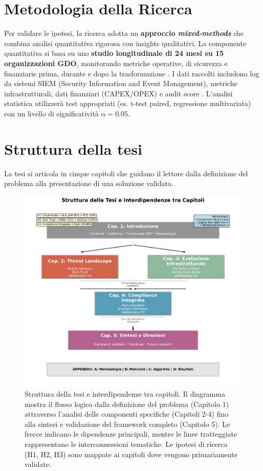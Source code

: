 \section{Metodologia della Ricerca}
Per validare le ipotesi, la ricerca adotta un  \textbf{approccio \textit{mixed-methods}} che combina analisi quantitativa rigorosa con insights qualitativi. La componente quantitativa si basa su uno
\textbf{studio longitudinale di 24 mesi su 15 organizzazioni GDO}, monitorando metriche operative, di sicurezza e finanziarie prima, durante e dopo la trasformazione . I dati raccolti includono log da sistemi SIEM (Security Information and Event Management), metriche infrastrutturali, dati finanziari (CAPEX/OPEX) e audit score . L'analisi statistica utilizzerà test appropriati (es. t-test paired, regressione multivariata) con un livello di significatività $\alpha=0.05$.

\section{Struttura della tesi}
La tesi si articola in cinque capitoli che guidano il lettore dalla definizione del problema alla presentazione di una soluzione validata.

\begin{figure}[htbp]
\centering
\includegraphics[width=\textwidth]{thesis_figures/cap1/fig_1_4_thesis_structure.pdf}
\caption{Struttura della tesi e interdipendenze tra capitoli. Il diagramma mostra il flusso logico dalla definizione del problema (Capitolo 1) attraverso l'analisi delle componenti specifiche (Capitoli 2-4) fino alla sintesi e validazione del framework completo (Capitolo 5). Le frecce indicano le dipendenze principali, mentre le linee tratteggiate rappresentano le interconnessioni tematiche. Le ipotesi di ricerca (H1, H2, H3) sono mappate ai capitoli dove vengono primariamente validate.}
\label{fig:thesis_structure}
\end{figure}


